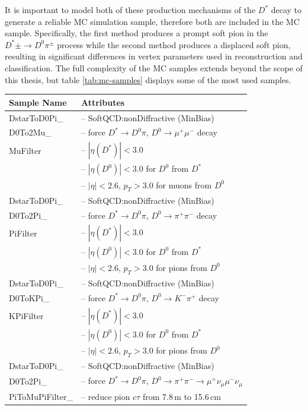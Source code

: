 It is important to model both of these production mechanisms of the $D^*$ decay to generate a reliable MC simulation sample, therefore both are included in the MC sample. Specifically, the first method produces a prompt soft pion in the $D^*\pm \to D^0 \pi^\pm$ process while the second method produces a displaced soft pion, resulting in significant differences in vertex parameters used in reconstruction and classification. The full complexity of the MC samples extends beyond the scope of this thesis, but table \ref{tab:mc-samples} displays some of the most used samples.

\begin{table}
\centering
\begin{tabular}{|p{3.2cm}|p{12cm}|}
    \hline
    \textbf{Sample Name} & \textbf{Attributes} \\
    \hline
    DstarToD0Pi\_ & -- SoftQCD:nonDiffractive (MinBias) \\
    D0To2Mu\_ & -- force $D^* \to D^0\pi$, $D^0 \to \mu^+\mu^-$ decay \\
    MuFilter & -- $|\eta(D^*)| < 3.0$ \\
    & -- $|\eta(D^0)| < 3.0$ for $D^0$ from $D^*$ \\
    & -- $|\eta| < 2.6$, $p_T > 3.0$ for muons from $D^0$ \\
    \hline
    DstarToD0Pi\_ & -- SoftQCD:nonDiffractive (MinBias) \\
    D0To2Pi\_ & -- force $D^* \to D^0\pi$, $D^0 \to \pi^+\pi^-$ decay \\
    PiFilter & -- $|\eta(D^*)| < 3.0$ \\
    & -- $|\eta(D^0)| < 3.0$ for $D^0$ from $D^*$ \\
    & -- $|\eta| < 2.6$, $p_T > 3.0$ for pions from $D^0$ \\
    \hline
    DstarToD0Pi\_ & -- SoftQCD:nonDiffractive (MinBias) \\
    D0ToKPi\_ & -- force $D^* \to D^0\pi$, $D^0 \to K^-\pi^+$ decay \\
    KPiFilter & -- $|\eta(D^*)| < 3.0$ \\
    & -- $|\eta(D^0)| < 3.0$ for $D^0$ from $D^*$ \\
    & -- $|\eta| < 2.6$, $p_T > 3.0$ for pions from $D^0$ \\
    \hline
    DstarToD0Pi\_ & -- SoftQCD:nonDiffractive (MinBias) \\
    D0To2Pi\_ & -- force $D^* \to D^0\pi$, $D^0 \to \pi^+\pi^- \to \mu^+\nu_\mu\mu^-\nu_\mu$ \\
    PiToMuPiFilter\_ & -- reduce pion $c\tau$ from 7.8\,m to 15.6\,cm \\

\end{tabular}
\end{table}
